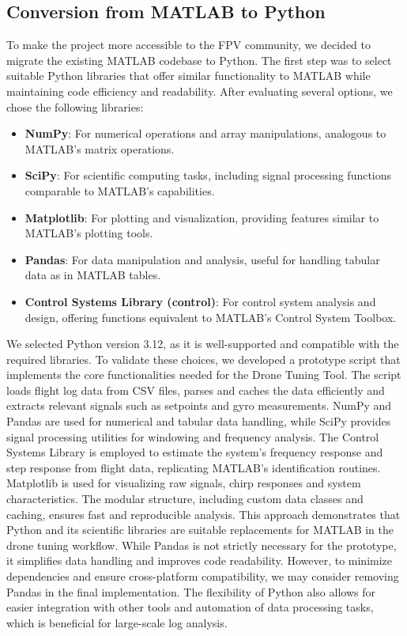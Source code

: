 \documentclass[a4paper,11pt]{scrartcl}
\begin{document}
\clearpage

\subsection{Conversion from MATLAB to Python}

To make the project more accessible to the FPV community, we decided to migrate the existing MATLAB codebase to Python.
The first step was to select suitable Python libraries that offer similar functionality to MATLAB while maintaining code efficiency and readability.
After evaluating several options, we chose the following libraries:
\begin{itemize}
	\item \textbf{NumPy}: For numerical operations and array manipulations, analogous to MATLAB's matrix operations.
	\item \textbf{SciPy}: For scientific computing tasks, including signal processing functions comparable to MATLAB's capabilities.
	\item \textbf{Matplotlib}: For plotting and visualization, providing features similar to MATLAB's plotting tools.
	\item \textbf{Pandas}: For data manipulation and analysis, useful for handling tabular data as in MATLAB tables.
	\item \textbf{Control Systems Library (control)}: For control system analysis and design, offering functions equivalent to MATLAB's Control System Toolbox.
\end{itemize}
We selected Python version 3.12, as it is well-supported and compatible with the required libraries.
To validate these choices, we developed a prototype script that implements the core functionalities needed for the Drone Tuning Tool.
The script loads flight log data from CSV files, parses and caches the data efficiently and extracts relevant signals such as setpoints and gyro measurements.
NumPy and Pandas are used for numerical and tabular data handling, while SciPy provides signal processing utilities for windowing and frequency analysis.
The Control Systems Library is employed to estimate the system's frequency response and step response from flight data, replicating MATLAB's identification routines.
Matplotlib is used for visualizing raw signals, chirp responses and system characteristics.
The modular structure, including custom data classes and caching, ensures fast and reproducible analysis.
This approach demonstrates that Python and its scientific libraries are suitable replacements for MATLAB in the drone tuning workflow.
While Pandas is not strictly necessary for the prototype, it simplifies data handling and improves code readability.
However, to minimize dependencies and ensure cross-platform compatibility, we may consider removing Pandas in the final implementation.
The flexibility of Python also allows for easier integration with other tools and automation of data processing tasks, which is beneficial for large-scale log analysis.
\end{document}
